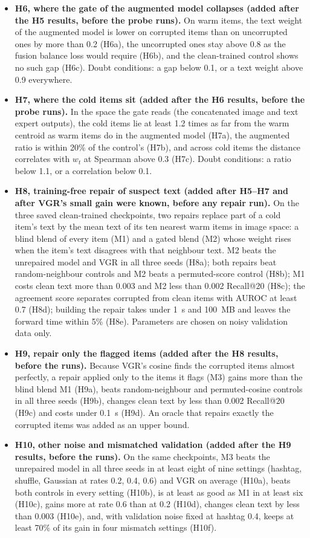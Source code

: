 \documentclass[conference]{IEEEtran}
\begin{document}
\begin{itemize}
\item \textbf{H6, where the gate of the augmented model collapses (added after the H5 results, before the probe runs).} On warm items, the text weight of the augmented model is lower on corrupted items than on uncorrupted ones by more than 0.2 (H6a), the uncorrupted ones stay above 0.8 as the fusion balance loss would require (H6b), and the clean-trained control shows no such gap (H6c). Doubt conditions: a gap below 0.1, or a text weight above 0.9 everywhere.
\item \textbf{H7, where the cold items sit (added after the H6 results, before the probe runs).} In the space the gate reads (the concatenated image and text expert outputs), the cold items lie at least 1.2 times as far from the warm centroid as warm items do in the augmented model (H7a), the augmented ratio is within 20\% of the control's (H7b), and across cold items the distance correlates with $w_t$ at Spearman above 0.3 (H7c). Doubt conditions: a ratio below 1.1, or a correlation below 0.1.
\item \textbf{H8, training-free repair of suspect text (added after H5--H7 and after VGR's small gain were known, before any repair run).} On the three saved clean-trained checkpoints, two repairs replace part of a cold item's text by the mean text of its ten nearest warm items in image space: a blind blend of every item (M1) and a gated blend (M2) whose weight rises when the item's text disagrees with that neighbour text. M2 beats the unrepaired model and VGR in all three seeds (H8a); both repairs beat random-neighbour controls and M2 beats a permuted-score control (H8b); M1 costs clean text more than 0.003 and M2 less than 0.002 Recall@20 (H8c); the agreement score separates corrupted from clean items with AUROC at least 0.7 (H8d); building the repair takes under 1~s and 100~MB and leaves the forward time within 5\% (H8e). Parameters are chosen on noisy validation data only.
\item \textbf{H9, repair only the flagged items (added after the H8 results, before the runs).} Because VGR's cosine finds the corrupted items almost perfectly, a repair applied only to the items it flags (M3) gains more than the blind blend M1 (H9a), beats random-neighbour and permuted-cosine controls in all three seeds (H9b), changes clean text by less than 0.002 Recall@20 (H9c) and costs under 0.1~s (H9d). An oracle that repairs exactly the corrupted items was added as an upper bound.
\item \textbf{H10, other noise and mismatched validation (added after the H9 results, before the runs).} On the same checkpoints, M3 beats the unrepaired model in all three seeds in at least eight of nine settings (hashtag, shuffle, Gaussian at rates 0.2, 0.4, 0.6) and VGR on average (H10a), beats both controls in every setting (H10b), is at least as good as M1 in at least six (H10c), gains more at rate 0.6 than at 0.2 (H10d), changes clean text by less than 0.003 (H10e), and, with validation noise fixed at hashtag 0.4, keeps at least 70\% of its gain in four mismatch settings (H10f).

\end{itemize}
\end{document}
